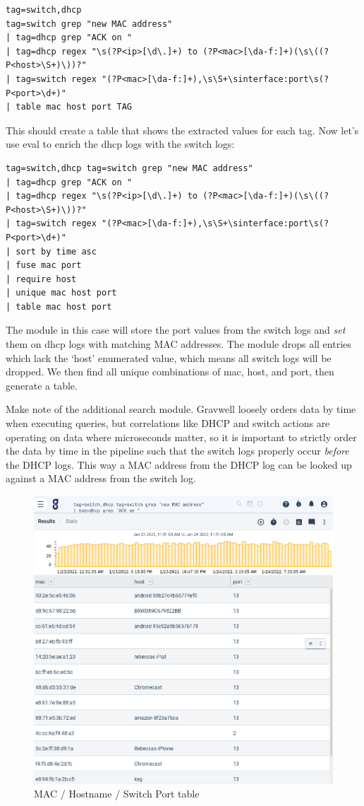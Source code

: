 \begin{Verbatim}[breaklines=true]
tag=switch,dhcp
tag=switch grep "new MAC address" 
| tag=dhcp grep "ACK on " 
| tag=dhcp regex "\s(?P<ip>[\d\.]+) to (?P<mac>[\da-f:]+)(\s\((?P<host>\S+)\))?"
| tag=switch regex "(?P<mac>[\da-f:]+),\s\S+\sinterface:port\s(?P<port>\d+)"
| table mac host port TAG
\end{Verbatim}

This should create a table that shows the extracted values for each
tag. Now let's use eval to enrich the dhcp logs with the switch logs:

\begin{Verbatim}[breaklines=true]
tag=switch,dhcp tag=switch grep "new MAC address"
| tag=dhcp grep "ACK on "
| tag=dhcp regex "\s(?P<ip>[\d\.]+) to (?P<mac>[\da-f:]+)(\s\((?P<host>\S+)\))?"
| tag=switch regex "(?P<mac>[\da-f:]+),\s\S+\sinterface:port\s(?P<port>\d+)"
| sort by time asc
| fuse mac port
| require host 
| unique mac host port 
| table mac host port
\end{Verbatim}

The  module in this case will store the port values from the switch logs and \emph{set} them on dhcp logs with matching MAC addresses. The  module drops all entries which lack the `host' enumerated value, which means all switch logs will be dropped. We then find all unique combinations of mac, host, and port, then generate a table. 

Make note of the additional  search module.  Gravwell
loosely orders data by time when executing queries, but correlations like
DHCP and switch actions are operating on data where microseconds matter,
so it is important to strictly order the data by time in the pipeline
such that the switch logs properly occur \emph{before} the DHCP logs. This way a MAC address
from the DHCP log can be looked up against a MAC address from the switch log.

\begin{figure}
	\includegraphics[width=0.6\linewidth]{images/mac-host-table.png}
	\caption{MAC / Hostname / Switch Port table}
	\label{fig:mac-host-table}
\end{figure}

